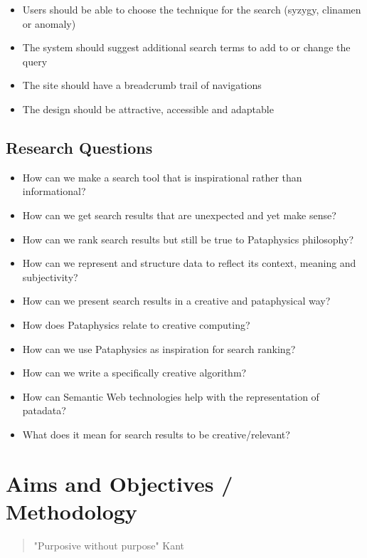 \begin{itemize}
  \item Users should be able to choose the technique for the search (syzygy, clinamen or anomaly)
  \item The system should suggest additional search terms to add to or change the query
  \item The site should have a breadcrumb trail of navigations
  \item The design should be attractive, accessible and adaptable
\end{itemize}

\subsection{Research Questions}

\begin{itemize}
  \item How can we make a search tool that is inspirational rather than informational?
  \item How can we get search results that are unexpected and yet make sense?
  \item How can we rank search results but still be true to Pataphysics philosophy?
  \item How can we represent and structure data to reflect its context, meaning and subjectivity?
  \item How can we present search results in a creative and pataphysical way?
  \item How does Pataphysics relate to creative computing?
  \item How can we use Pataphysics as inspiration for search ranking?
  \item How can we write a specifically creative algorithm?
  \item How can Semantic Web technologies help with the representation of patadata?
  \item What does it mean for search results to be creative/relevant?
\end{itemize}


\section{Aims and Objectives / Methodology}

\begin{quote}
  "Purposive without purpose" Kant
\end{quote}

